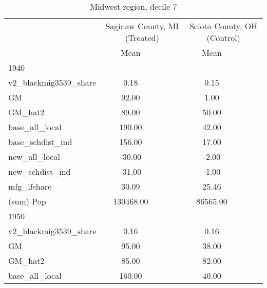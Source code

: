 \begin{table}[htbp]\centering
\def\sym#1{\ifmmode^{#1}\else\(^{#1}\)\fi}
\caption{Midwest region, decile 7 \label{tab1}}
\begin{tabular}{l*{2}{ccc}}
\toprule
                    &\multicolumn{3}{c}{Saginaw County, MI (Treated)}&\multicolumn{3}{c}{Scioto County, OH (Control)}\\
                    &        Mean&            &            &        Mean&            &            \\
\midrule
1940                &            &            &            &            &            &            \\
v2\_blackmig3539\_share&        0.18&            &            &        0.15&            &            \\
GM                  &       92.00&            &            &        1.00&            &            \\
GM\_hat2             &       89.00&            &            &       50.00&            &            \\
base\_all\_local      &      190.00&            &            &       42.00&            &            \\
base\_schdist\_ind    &      156.00&            &            &       17.00&            &            \\
new\_all\_local       &      -30.00&            &            &       -2.00&            &            \\
new\_schdist\_ind     &      -31.00&            &            &       -1.00&            &            \\
mfg\_lfshare         &       30.09&            &            &       25.46&            &            \\
(sum) Pop           &   130468.00&            &            &    86565.00&            &            \\
\midrule
1950                &            &            &            &            &            &            \\
v2\_blackmig3539\_share&        0.16&            &            &        0.16&            &            \\
GM                  &       95.00&            &            &       38.00&            &            \\
GM\_hat2             &       85.00&            &            &       82.00&            &            \\
base\_all\_local      &      160.00&            &            &       40.00&            &            \\

\end{tabular}
\end{table}
